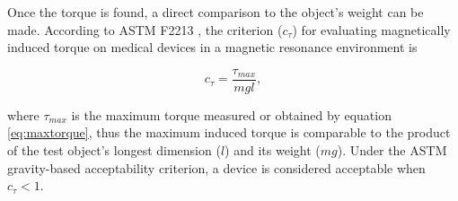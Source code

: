 Once the torque is found, a direct comparison to the object's weight can be made. According to ASTM F2213 \cite{astm2213, stoianovici2024}, the criterion ($c_\tau$) for evaluating magnetically induced torque on medical devices in a magnetic resonance environment is

\begin{equation}
	c_\tau = \frac{\tau_{max}}{mgl},
	\label{eq:gravTorque}
\end{equation} 

\noindent where $\tau_{max}$ is the maximum torque measured or obtained by equation \ref{eq:maxtorque}, thus the maximum induced torque is comparable to the product of the test object's longest dimension ($l$) and its weight ($mg$). Under the ASTM gravity-based acceptability criterion, a device is considered acceptable when $c_\tau < 1$.